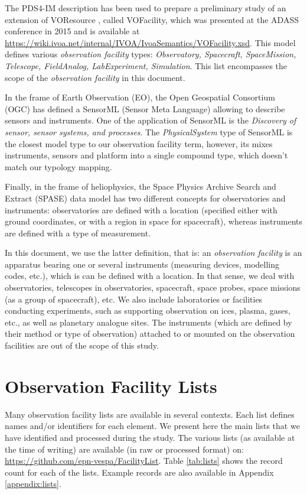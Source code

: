 \documentclass[11pt,a4paper]{ivoa}
\begin{document}
The PDS4-IM description has been used to prepare a preliminary study of
an extension of VOResource \citep{2018ivoa.spec.0625P}, called VOFacility, 
which was presented at the ADASS conference in 2015 \citep{Louys:2015to} 
and is available at \url{https://wiki.ivoa.net/internal/IVOA/IvoaSemantics/VOFacility.xsd}. 
This model defines various \emph{observation facility} types: 
\emph{Observatory, Spacecraft, SpaceMission, Telescope, FieldAnalog,
LabExperiment, Simulation}. This list encompasses the scope of the 
\emph{observation facility} in this document.

In the frame of Earth Observation (EO), the Open Geospatial Consortium
(OGC) has defined a SensorML (Sensor Meta Language) \citep{ogc-sensorml} 
allowing to describe sensors and instruments. One of the application of 
SensorML is the \emph{Discovery of sensor, sensor systems, and processes}. 
The \emph{PhysicalSystem} type of SensorML is the closest model type to
our observation facility term, however, its mixes instruments, sensors 
and platform into a single compound type, which doesn't match our 
typology mapping. 

Finally, in the frame of heliophysics, the Space Physics Archive Search
and Extract (SPASE) data model \citep{Roberts:2018bi} has two different
concepts for observatories and instruments: observatories are defined 
with a location (specified either with ground coordinates, or with a 
region in space for spacecraft), whereas instruments are defined with 
a type of measurement. 

In this document, we use the latter definition, that is: an 
\emph{observation facility} is an apparatus bearing one or several 
instruments (measuring devices, modelling codes, etc.), which is 
can be defined with a location. In that sense, we deal with observatories, 
telescopes in observatories, spacecraft, space probes, space missions 
(as a group of spacecraft), etc. We also include laboratories or 
facilities conducting  experiments, such as supporting observation on 
ices, plasma, gases, etc., as well as planetary analogue sites. The 
instruments (which are defined by their method or type of observation) 
attached to or mounted on the observation facilities are out of the scope 
of this study.


\section{Observation Facility Lists}
Many observation facility lists are available in several contexts. Each list
defines names and/or identifiers for each element. We present here the main 
lists that we have identified and processed during the study. The various 
lists (as available at the time of writing) are available (in raw or 
processed format) on: \url{https://github.com/epn-vespa/FacilityList}.
Table \ref{tab:lists} shows the record count for each of the lists. 
Example records are also available in Appendix \ref{appendix:lists}. 
\end{document}
